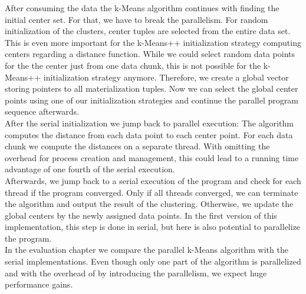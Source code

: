 After consuming the data the k-Means algorithm continues with finding the initial center set. For that, we have to break the parallelism. For random initialization of the clusters, center tuples are selected from the entire data set. This is even more important for the k-Means++ initialization strategy computing centers regarding a distance function. While we could select random data points for the the center just from one data chunk, this is not possible for the k-Means++ initialization strategy anymore. Therefore, we create a global vector storing pointers to all materialization tuples. Now we can select the global center points using one of our initialization strategies and continue the parallel program sequence afterwards.
\\
After the serial initialization we jump back to parallel execution: The algorithm computes the distance from each data point to each center point. For each data chunk we compute the distances on a separate thread. With omitting the overhead for process creation and management, this could lead to a running time advantage of one fourth of the serial execution.
\\
Afterwards, we jump back to a serial execution of the program and check for each thread if the program converged. Only if all threads converged, we can terminate the algorithm and output the result of the clustering. Otherwise, we update the global centers by the newly assigned data points. In the first version of this implementation, this step is done in serial, but here is also potential to parallelize the program.
\\
In the evaluation chapter we compare the parallel k-Means algorithm with the serial implementations. Even though only one part of the algorithm is parallelized and with the overhead of by introducing the parallelism, we expect huge performance gains.





